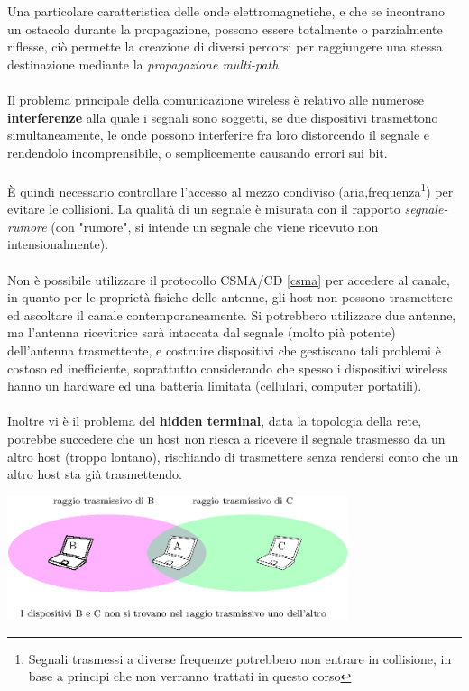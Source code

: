 \documentclass[12pt, letterpaper]{article}
\newcommand{\acc}{\\\hphantom{}\\}
\begin{document}
Una particolare caratteristica delle onde elettromagnetiche, e che se incontrano un ostacolo durante la propagazione, 
possono essere totalmente o parzialmente riflesse, ciò permette la creazione di diversi percorsi per raggiungere 
una stessa destinazione mediante la \textit{propagazione multi-path}.\acc 
Il problema principale della comunicazione wireless è relativo alle numerose \textbf{interferenze} alla quale i segnali sono 
soggetti, se due dispositivi trasmettono simultaneamente, le onde possono interferire fra loro distorcendo il segnale 
 e rendendolo incomprensibile, o semplicemente causando errori sui bit.\acc 
È quindi necessario controllare l'accesso al mezzo condiviso (aria,frequenza\footnote{
    Segnali trasmessi a diverse frequenze potrebbero non entrare in collisione, in base a principi che non verranno 
    trattati in questo corso
}) per evitare le collisioni. La qualità di un segnale è misurata con il rapporto \textit{segnale-rumore} (con "rumore", 
si intende un segnale che viene ricevuto non intensionalmente).\acc 
Non è possibile utilizzare il protocollo CSMA/CD \ref{csma} per accedere al canale, in quanto per le proprietà fisiche 
delle antenne, gli host non possono trasmettere ed ascoltare il canale contemporaneamente. Si potrebbero utilizzare due antenne, 
ma l'antenna ricevitrice sarà intaccata dal segnale (molto pià potente) dell'antenna trasmettente, e costruire 
dispositivi che gestiscano tali problemi è costoso ed inefficiente, soprattutto considerando che spesso i dispositivi 
wireless hanno un hardware ed una batteria limitata (cellulari, computer portatili).\acc 
Inoltre vi è il problema del \textbf{hidden terminal}, data la topologia della rete, potrebbe succedere che un host 
non riesca a ricevere il segnale trasmesso da un altro host (troppo lontano), rischiando di trasmettere senza rendersi conto 
che un altro host sta già trasmettendo. \begin{center}
    \includegraphics[width=0.75\textwidth ]{images/hiddenTerminal.eps}
\end{center}
\end{document}
